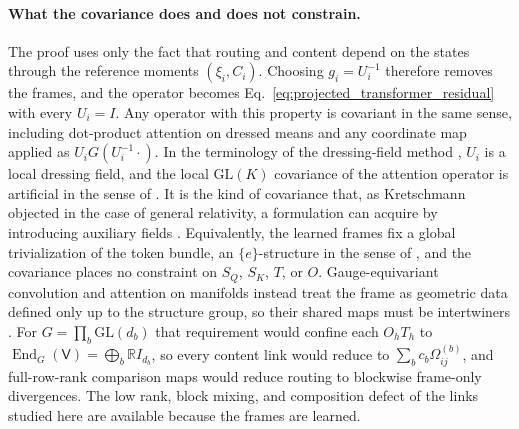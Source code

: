 \documentclass[twoside,11pt]{article}
\begin{document}
\paragraph{What the covariance does and does not constrain.}
The proof uses only the fact that routing and content depend on the states through the reference moments $(\xi_i,C_i)$. Choosing $g_i=U_i^{-1}$ therefore removes the frames, and the operator becomes Eq.~\eqref{eq:projected_transformer_residual} with every $U_i=I$. Any operator with this property is covariant in the same sense, including dot-product attention on dressed means and any coordinate map applied as $U_iG(U_i^{-1}\cdot)$. In the terminology of the dressing-field method \citep{Fournel2014Dressing}, $U_i$ is a local dressing field, and the local $\mathrm{GL}(K)$ covariance of the attention operator is artificial in the sense of \citet[Sec.~2.2]{Francois2019Artificial}. It is the kind of covariance that, as Kretschmann objected in the case of general relativity, a formulation can acquire by introducing auxiliary fields \citep{Norton1993}. Equivalently, the learned frames fix a global trivialization of the token bundle, an $\{e\}$-structure in the sense of \citet[Sec.~2.1.1]{weiler2021coordinate}, and the covariance places no constraint on $S_Q$, $S_K$, $T$, or $O$. Gauge-equivariant convolution and attention on manifolds instead treat the frame as geometric data defined only up to the structure group, so their shared maps must be intertwiners \citep[Sec.~2.4]{cohen2019gauge}\citep[Secs.~4.3 and 4.4]{He2021GaugeEquivariantTransformer}. For $G=\prod_b\mathrm{GL}(d_b)$ that requirement would confine each $O_hT_h$ to $\operatorname{End}_G(\mathsf V)=\bigoplus_b\mathbb RI_{d_b}$, so every content link would reduce to $\sum_bc_b\Omega_{ij}^{(b)}$, and full-row-rank comparison maps would reduce routing to blockwise frame-only divergences. The low rank, block mixing, and composition defect of the links studied here are available because the frames are learned.
\end{document}
